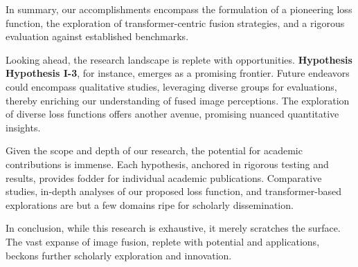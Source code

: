 In summary, our accomplishments encompass the formulation of a pioneering loss function, the exploration of transformer-centric fusion strategies, and a rigorous evaluation against established benchmarks.

Looking ahead, the research landscape is replete with opportunities. \textbf{Hypothesis Hypothesis I-3}, for instance, emerges as a promising frontier. Future endeavors could encompass qualitative studies, leveraging diverse groups for evaluations, thereby enriching our understanding of fused image perceptions. The exploration of diverse loss functions offers another avenue, promising nuanced quantitative insights.

Given the scope and depth of our research, the potential for academic contributions is immense. Each hypothesis, anchored in rigorous testing and results, provides fodder for individual academic publications. Comparative studies, in-depth analyses of our proposed loss function, and transformer-based explorations are but a few domains ripe for scholarly dissemination.

In conclusion, while this research is exhaustive, it merely scratches the surface. The vast expanse of image fusion, replete with potential and applications, beckons further scholarly exploration and innovation.